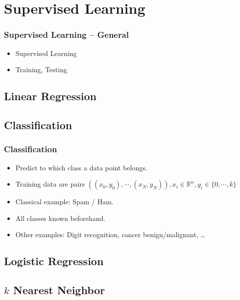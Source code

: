 \documentclass[english,final,compress]{beamer}
\begin{document}


\section{Supervised Learning}


\begin{frame}
    \frametitle{Supervised Learning -- General}
    \begin{itemize}
        \item Supervised Learning
        \item Training, Testing
    \end{itemize}
\end{frame}

\subsection{Linear Regression}



\subsection{Classification}
\begin{frame}
    \frametitle{Classification}
    \begin{itemize}
        \item Predict to which class a data point belongs.
        \item Training data are pairs $\left( (x_0, y_0), \cdots, (x_N, y_N)
                \right), x_i \in \mathbb{R}^n, y_i \in \{0, \cdots, k\}$
        \item Classical example: Spam / Ham.
        \item All classes known beforehand.
        \item Other examples: Digit recognition, cancer benign/malignant, \ldots
    \end{itemize}
\end{frame}

\subsection{Logistic Regression}



\subsection{$k$ Nearest Neighbor}


\end{document}
